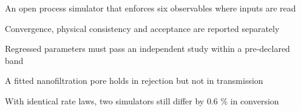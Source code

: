 \begin{highlights}
\item An open process simulator that enforces six observables where inputs are read
\item Convergence, physical consistency and acceptance are reported separately
\item Regressed parameters must pass an independent study within a pre-declared band
\item A fitted nanofiltration pore holds in rejection but not in transmission
\item With identical rate laws, two simulators still differ by 0.6 \% in conversion
\end{highlights}
